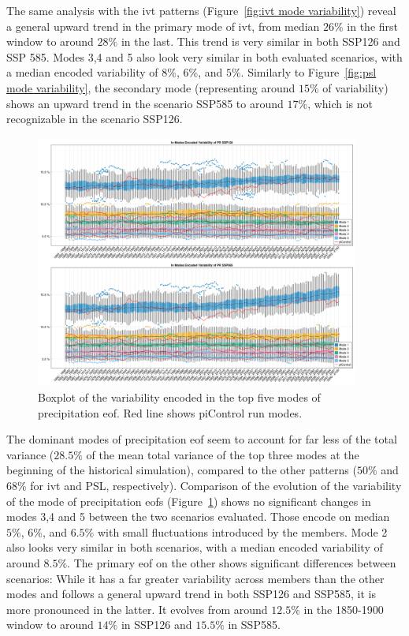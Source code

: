 The same analysis with the \ac{ivt} patterns (Figure~\ref{fig:ivt mode variability}) reveal a general upward trend in the primary mode of \ac{ivt}, from median $26\%$ in the first window to around $28\%$ in the last. 
This trend is very similar in both SSP126 and SSP 585. 
Modes 3,4 and 5 also look very similar in both evaluated scenarios, with a median encoded variability of $8\%$, $6\%$, and $5\%$. 
Similarly to Figure~\ref{fig:psl mode variability}, the secondary mode (representing around $15\%$ of variability) shows an upward trend in the scenario SSP585 to around $17\%$, which is not recognizable in the scenario SSP126. 

\begin{figure}[htb]
  \begin{center}
    \includegraphics[width=0.95\textwidth]{figures/mode_variability_pr_50seasons.png}
  \end{center}
  \caption[Explained Variability of PR Modes]{Boxplot of the variability encoded in the top five modes of precipitation \ac{eof}. Red line shows piControl run modes.}\label{fig:pr mode variability}
\end{figure}

The dominant modes of precipitation \ac{eof} seem to account for far less of the total variance ($28.5 \%$ of the mean total variance of the top three modes at the beginning of the historical simulation), compared to the other patterns ($50 \%$ and $68 \%$ for \ac{ivt} and PSL, respectively).  
Comparison of the evolution of the variability of the mode of precipitation \acp{eof} (Figure~\ref{fig:pr mode variability}) shows no significant changes in modes 3,4 and 5 between the two scenarios evaluated. 
Those encode on median $5\%$, $6\%$, and $6.5\%$ with small fluctuations introduced by the members. 
Mode 2 also looks very similar in both scenarios, with a median encoded variability of around $8.5\%$. 
The primary \ac{eof} on the other shows significant differences between scenarios: While it has a far greater variability across members than the other modes and follows a general upward trend in both SSP126 and SSP585, it is more pronounced in the latter. 
It evolves from around $12.5\%$ in the 1850-1900 window to around $14\%$ in SSP126 and $15.5\%$ in SSP585.  



